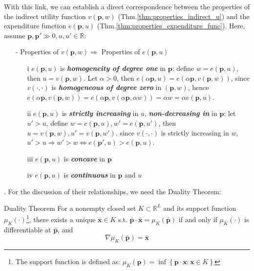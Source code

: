 With this link, we can establish a direct correspondence between the properties of the indirect utility function $v(\mathbf{p},w)$ (Thm.\ref{thm:properties_indirect_u}) and the expenditure function $e(\mathbf{p},u)$ (Thm.\ref{thm:properties_expenditure_func}). Here, assume $\mathbf{p},\mathbf{p}'\gg 0,u,u'\in\mathbb{R}$:
\begin{enumerate}
    \item[-] Properties of $v(\mathbf{p},w)\Rightarrow$ Properties of $e(\mathbf{p},u)$ 
    \begin{enumerate}
        \item[i] $e(\mathbf{p},u)$ is \textit{\textbf{homogeneity of degree one}} in $\mathbf{p}$: define $w=e(\mathbf{p},u)$, then $u=v(\mathbf{p},w)$. Let $\alpha >0$, then $e(\alpha\mathbf{p},u)= e(\alpha\mathbf{p},v(\mathbf{p},w))$, since $v(\cdot,\cdot)$ is \textit{\textbf{homogeneous of degree zero}} in $(\mathbf{p},w)$,
        hence $e(\alpha\mathbf{p},v(\mathbf{p},w))=e(\alpha\mathbf{p},v(\alpha\mathbf{p},\alpha w))=\alpha w =\alpha e(\mathbf{p},u)$.
        \item[ii] $e(\mathbf{p},u)$ is \textit{\textbf{strictly increasing}} in $u$, \textit{\textbf{non-decreasing in}} in $\mathbf{p}$: let $u'>u$, define $w=e(\mathbf{p},u),w'=e(\mathbf{p},u')$, then $u=v(\mathbf{p},w),u'=v(\mathbf{p},w')$. since $v(\cdot,\cdot)$ is strictly increasing in $w$, $u'>u\Rightarrow w'>w\Leftrightarrow e(\mathbf{p}',u)>e(\mathbf{p},u)$.
        \item[iii] $e(\mathbf{p},u)$ is \textit{\textbf{concave}} in $\mathbf{p}$
        \item[iv] $e(\mathbf{p},u)$ is \textit{\textbf{continuous}} in $\mathbf{p}$ and $u$
    \end{enumerate} 
\end{enumerate}



. For the discussion of their relationships, we need the Duality Theorem:
\begin{theorem*}{Duality Theorem}{}
    For a nonempty closed set $K\subset\mathbb{R}^L$ and its support function $\mu_{K}(\cdot)$\footnote{The support function is defined as: $\mu_K(\mathbf{p})=\inf\left\{\mathbf{p}\cdot\mathbf{x}:\mathbf{x}\in K\right\}$}, there exists a unique $\bar{\mathbf{x}}\in K$ s.t. $\bar{\mathbf{p}}\cdot\bar{\mathbf{x}}=\mu_K(\bar{\mathbf{p}})$ if and only if $\mu_K(\cdot)$ is differentiable at $\bar{\mathbf{p}}$, and $$ \nabla\mu_K(\bar{\mathbf{p}})=\bar{\mathbf{x}} $$
\end{theorem*}

